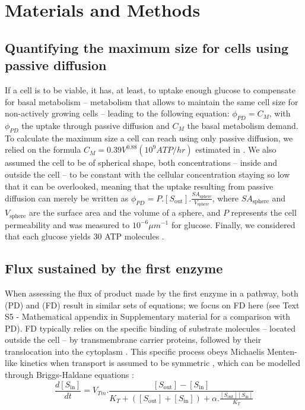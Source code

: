 \documentclass[11pt,onecolumn]{article}
\begin{document}
\section{Materials and Methods\label{sec:M&M}}

\subsection{Quantifying the maximum size for cells using passive diffusion}

If a cell is to be viable, it has, at least, to uptake enough glucose to compensate for basal metabolism -- metabolism that allows to maintain the same cell size for non-actively growing cells \citep{Lynch15} -- leading to the following equation: $\phi_{PD}=C_M$, with $\phi_{PD}$ the uptake through passive diffusion and $C_M$ the basal metabolism demand. To calculate the maximum size a cell can reach using only passive diffusion, we relied on the formula $C_M=0.39V^{0.88} (10^9 ATP/hr)$ estimated in \citep{Lynch15}. We also assumed the cell to be of spherical shape, both concentrations -- inside and outside the cell -- to be constant with the cellular concentration staying so low that it can be overlooked, meaning that the uptake resulting from passive diffusion can merely be written as $\phi_{PD}=P.[S_{\text{out}}].\frac{SA_{\text{sphere}}}{V_{\text{sphere}}}$, where $SA_{\text{sphere}}$ and $V_{\text{sphere}}$ are the surface area and the volume of a sphere, and $P$ represents the cell permeability and was measured to $10^{-6}\mu m^{-1}$ \citep{Wood68} for glucose. Finally, we considered that each glucose yields 30 ATP molecules \citep{Rich03}. 

\subsection{Flux sustained by the first enzyme}

When assessing the flux of product made by the first enzyme in a pathway, both (PD) and (FD) result in similar sets of equations; we focus on FD here (see Text S5 - Mathematical appendix in Supplementary material for a comparison with PD). FD typically relies on the specific binding of substrate molecules -- located outside the cell -- by transmembrane carrier proteins, followed by their translocation into the cytoplasm \citep{danielli1954,Wilbrandt61,Kotyk67}. This specific process obeys Michaelis Menten-like kinetics when transport is assumed to be symmetric \citep{Kotyk67}, which can be modelled through Briggs-Haldane equations \citep{Briggs25,Haldane30,Stein86d}:
\small
\begin{equation}
\frac{d[S_\text{in}]}{dt}=V_{Tm}.\frac{[S_\text{out}]-[S_\text{in}]}{K_T+([S_\text{out}]+[S_\text{in}])+\alpha.\frac{[S_\text{out}][S_\text{in}]}{K_T}}
\end{equation}
\normalsize
\end{document}
